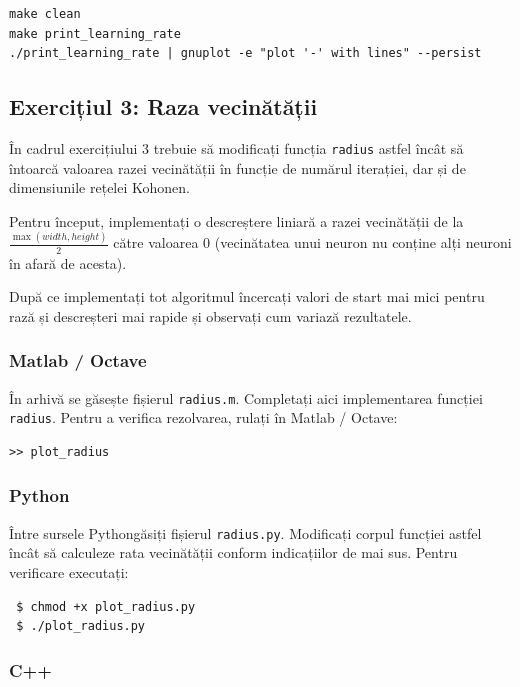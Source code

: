 \documentclass[12pt]{article}%
\newcommand{\mat}{{\color{brightmaroon} Matlab / Octave}}
\newcommand{\pyt}{{\color{cadmiumgreen} Python}}
\newcommand{\cc}{{\color{cobalt} C++}}
\begin{document}
\begin{verbatim}
make clean
make print_learning_rate
./print_learning_rate | gnuplot -e "plot '-' with lines" --persist
\end{verbatim}

\subsection{Exercițiul 3: Raza vecinătății}
\label{sec:task3}

În cadrul exercițiului 3 trebuie să modificați funcția \texttt{radius}
astfel încât să întoarcă valoarea razei vecinătății în funcție de
numărul iterației, dar și de dimensiunile rețelei Kohonen.

Pentru început, implementați o descreștere liniară a razei vecinătății
de la $\frac{\max(width,height)}{2}$ către valoarea 0 (vecinătatea
unui neuron nu conține alți neuroni în afară de acesta).

După ce implementați tot algoritmul încercați valori de start mai mici
pentru rază și descreșteri mai rapide și observați cum variază
rezultatele.

\subsubsection*{\mat}
\label{mat3}

În arhivă se găsește fișierul \texttt{radius.m}. Completați aici
implementarea funcției \texttt{radius}. Pentru a verifica rezolvarea,
rulați în \mat:
\begin{verbatim}
>> plot_radius
\end{verbatim}

\subsubsection{\pyt}
\label{sec:pyt3}

Între sursele \pyt găsiți fișierul \texttt{radius.py}. Modificați
corpul funcției astfel încât să calculeze rata vecinătății conform
indicațiilor de mai sus. Pentru verificare executați:

\begin{verbatim}
 $ chmod +x plot_radius.py
 $ ./plot_radius.py
\end{verbatim}

\subsubsection{\cc}
\label{sec:cc3}
\end{document}
